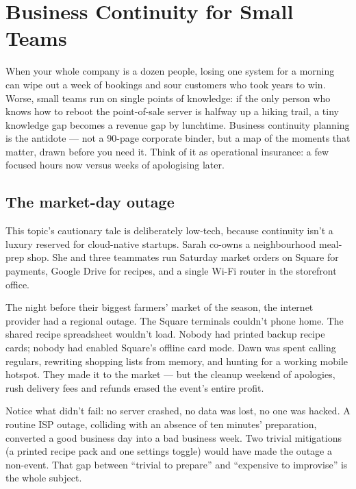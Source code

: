 \section{Business Continuity for Small Teams}
When your whole company is a dozen people, losing one system for a morning can wipe out a week of bookings and sour customers who took years to win. Worse, small teams run on single points of knowledge: if the only person who knows how to reboot the point-of-sale server is halfway up a hiking trail, a tiny knowledge gap becomes a revenue gap by lunchtime. Business continuity planning is the antidote — not a 90-page corporate binder, but a map of the moments that matter, drawn before you need it. Think of it as operational insurance: a few focused hours now versus weeks of apologising later.



\subsection{The market-day outage}


This topic's cautionary tale is deliberately low-tech, because continuity isn't a luxury reserved for cloud-native startups. Sarah co-owns a neighbourhood meal-prep shop. She and three teammates run Saturday market orders on Square for payments, Google Drive for recipes, and a single Wi-Fi router in the storefront office.


The night before their biggest farmers' market of the season, the internet provider had a regional outage. The Square terminals couldn't phone home. The shared recipe spreadsheet wouldn't load. Nobody had printed backup recipe cards; nobody had enabled Square's offline card mode. Dawn was spent calling regulars, rewriting shopping lists from memory, and hunting for a working mobile hotspot. They made it to the market — but the cleanup weekend of apologies, rush delivery fees and refunds erased the event's entire profit.


Notice what didn't fail: no server crashed, no data was lost, no one was hacked. A routine ISP outage, colliding with an absence of ten minutes' preparation, converted a good business day into a bad business week. Two trivial mitigations (a printed recipe pack and one settings toggle) would have made the outage a non-event. That gap between ``trivial to prepare'' and ``expensive to improvise'' is the whole subject.



